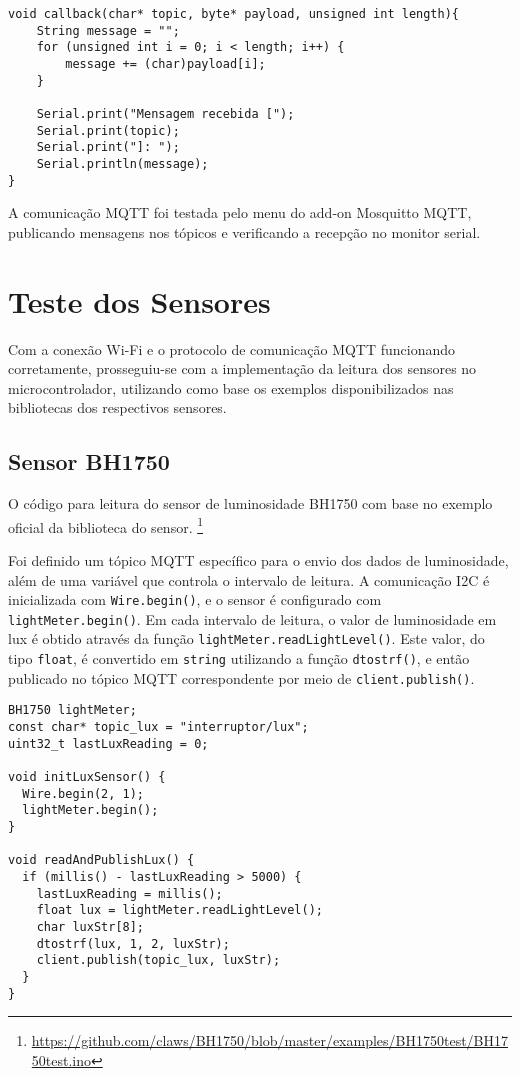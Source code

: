 \documentclass[]{abntex2}
\begin{document}
\begin{verbatim}
void callback(char* topic, byte* payload, unsigned int length){
	String message = "";
	for (unsigned int i = 0; i < length; i++) {
		message += (char)payload[i];
	}

	Serial.print("Mensagem recebida [");
	Serial.print(topic);
	Serial.print("]: ");
	Serial.println(message);
}
\end{verbatim}

A comunicação MQTT foi testada pelo menu do add-on Mosquitto MQTT, publicando
mensagens nos tópicos e verificando a recepção no monitor serial.

\section{Teste dos Sensores}
Com a conexão Wi-Fi e o protocolo de comunicação MQTT funcionando corretamente,
prosseguiu-se com a implementação da leitura dos sensores no microcontrolador,
utilizando como base os exemplos disponibilizados nas bibliotecas dos
respectivos sensores.

\subsection{Sensor BH1750}

O código para leitura do sensor de luminosidade BH1750 com base no exemplo
oficial da biblioteca do sensor.
\footnote{\url{https://github.com/claws/BH1750/blob/master/examples/BH1750test/BH1750test.ino}}


Foi definido um tópico MQTT específico para o envio dos dados de luminosidade,
além de uma variável que controla o intervalo de leitura. A comunicação I2C é
inicializada com
\texttt{Wire.begin()}, e o sensor é configurado com
\texttt{lightMeter.begin()}.
Em cada intervalo de leitura, o valor de luminosidade em lux é obtido através
da função \texttt{lightMeter.readLightLevel()}. Este valor, do tipo
\texttt{float}, é convertido em \texttt{string} utilizando a função
\texttt{dtostrf()}, e então publicado no tópico MQTT correspondente por meio de
\texttt{client.publish()}.
\clearpage
\begin{verbatim}
BH1750 lightMeter;
const char* topic_lux = "interruptor/lux";
uint32_t lastLuxReading = 0;

void initLuxSensor() {
  Wire.begin(2, 1);
  lightMeter.begin();
}

void readAndPublishLux() {
  if (millis() - lastLuxReading > 5000) {
    lastLuxReading = millis();
    float lux = lightMeter.readLightLevel();
    char luxStr[8];
    dtostrf(lux, 1, 2, luxStr);
    client.publish(topic_lux, luxStr);
  }
}
\end{verbatim}
\end{document}
